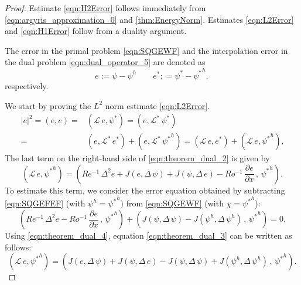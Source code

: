 \begin{proof}
  Estimate \eqref{eqn:H2Error} follows immediately from
  \eqref{eqn:argyris_approximation_0} and \autoref{thm:EnergyNorm}.
  Estimates \eqref{eqn:L2Error} and \eqref{eqn:H1Error} follow from a duality
  argument.

  The error in the primal problem \eqref{eqn:SQGEWF} and the interpolation error
  in the dual problem  \eqref{eqn:dual_operator_5} are denoted as
  \begin{equation}
    e := \psi - \psi^h \qquad e^* : = \psi^* - {\psi^*}^h ,
    \label{eqn:theorem_dual_1}
  \end{equation}
  respectively.

  We start by proving the $L^2$ norm estimate \eqref{eqn:L2Error}.
  \begin{align}
    |e|^2 = (e , e) =& (\mathcal{L} \, e , \psi^*)
      = (e , \mathcal{L}^* \, \psi^*) \nonumber \\
    =& (e , \mathcal{L}^* \, e^*) + (e , \mathcal{L}^* \, {\psi^*}^h)
      = (\mathcal{L} \, e , e^*) + (\mathcal{L} \, e , {\psi^*}^h) .
    \label{eqn:theorem_dual_2}
  \end{align}
  The last term on the right-hand side of \eqref{eqn:theorem_dual_2} is given by
  \begin{equation}
    (\mathcal{L} \, e , {\psi^*}^h) = \left( Re^{-1} \, \Delta^2 e
      + J(e , \Delta \, \psi) + J(\psi , \Delta \, e)
      - Ro^{-1} \, \frac{\partial e}{\partial x} \, , \, {\psi^*}^h \right) .
    \label{eqn:theorem_dual_3}
  \end{equation}
  To estimate this term, we consider the error equation obtained by subtracting
  \eqref{eqn:SQGEFEF} (with $\psi^h= {\psi^*}^h$) from \eqref{eqn:SQGEWF} (with
  $\chi = {\psi^*}^h$):
  \begin{equation}
    \left( Re^{-1} \, \Delta^2 e - Ro^{-1} \, \frac{\partial e}{\partial x} \, ,
      \, {\psi^*}^h \right) + \left( J(\psi , \Delta \, \psi)
      - J(\psi^h , \Delta \, \psi^h) \, , \, {\psi^*}^h \right) = 0 .
    \label{eqn:theorem_dual_4}
  \end{equation}
  Using \eqref{eqn:theorem_dual_4}, equation \eqref{eqn:theorem_dual_3} can be
  written as follows:
  \begin{equation}
    (\mathcal{L} \, e , {\psi^*}^h) = \left( J(e , \Delta \, \psi)
      + J(\psi , \Delta \, e) - J(\psi , \Delta \, \psi)
      + J(\psi^h , \Delta \, \psi^h) \, , \, {\psi^*}^h \right) .
    \label{eqn:theorem_dual_5}
  \end{equation}

\end{proof}
